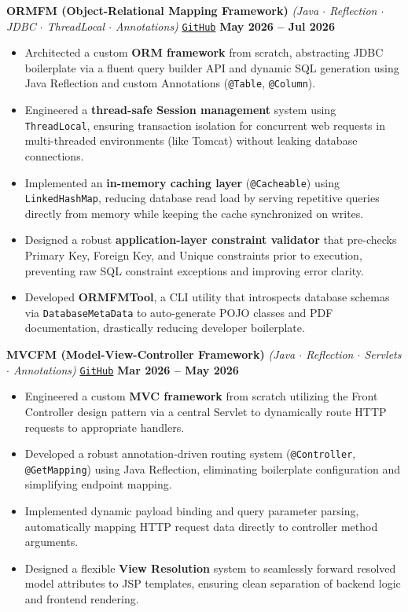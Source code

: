 \documentclass[a4paper,10pt]{article}
\begin{document}
\textbf{ORMFM (Object-Relational Mapping Framework)} \textit{(Java $\cdot$ Reflection $\cdot$ JDBC $\cdot$ ThreadLocal $\cdot$ Annotations)}
\hfill \href{https://github.com/ashvin-parmar/orm-fm}{\texttt{GitHub}} \quad \textbf{May 2026 -- Jul 2026}
\begin{itemize}
  \item Architected a custom \textbf{ORM framework} from scratch, abstracting JDBC boilerplate via a fluent query builder API and dynamic SQL generation using Java Reflection and custom Annotations (\texttt{@Table}, \texttt{@Column}).
  \item Engineered a \textbf{thread-safe Session management} system using \texttt{ThreadLocal}, ensuring transaction isolation for concurrent web requests in multi-threaded environments (like Tomcat) without leaking database connections.
  \item Implemented an \textbf{in-memory caching layer} (\texttt{@Cacheable}) using \texttt{LinkedHashMap}, reducing database read load by serving repetitive queries directly from memory while keeping the cache synchronized on writes.
  \item Designed a robust \textbf{application-layer constraint validator} that pre-checks Primary Key, Foreign Key, and Unique constraints prior to execution, preventing raw SQL constraint exceptions and improving error clarity.
  \item Developed \textbf{ORMFMTool}, a CLI utility that introspects database schemas via \texttt{DatabaseMetaData} to auto-generate POJO classes and PDF documentation, drastically reducing developer boilerplate.
\end{itemize}

\vspace{0.5mm}

\textbf{MVCFM (Model-View-Controller Framework)} \textit{(Java $\cdot$ Reflection $\cdot$ Servlets $\cdot$ Annotations)}
\hfill \href{https://github.com/ashvin-parmar/mvc-fm}{\texttt{GitHub}} \quad \textbf{Mar 2026 -- May 2026}
\begin{itemize}
  \item Engineered a custom \textbf{MVC framework} from scratch utilizing the Front Controller design pattern via a central Servlet to dynamically route HTTP requests to appropriate handlers.
  \item Developed a robust annotation-driven routing system (\texttt{@Controller}, \texttt{@GetMapping}) using Java Reflection, eliminating boilerplate configuration and simplifying endpoint mapping.
  \item Implemented dynamic payload binding and query parameter parsing, automatically mapping HTTP request data directly to controller method arguments.
  \item Designed a flexible \textbf{View Resolution} system to seamlessly forward resolved model attributes to JSP templates, ensuring clean separation of backend logic and frontend rendering.
\end{itemize}
\end{document}
